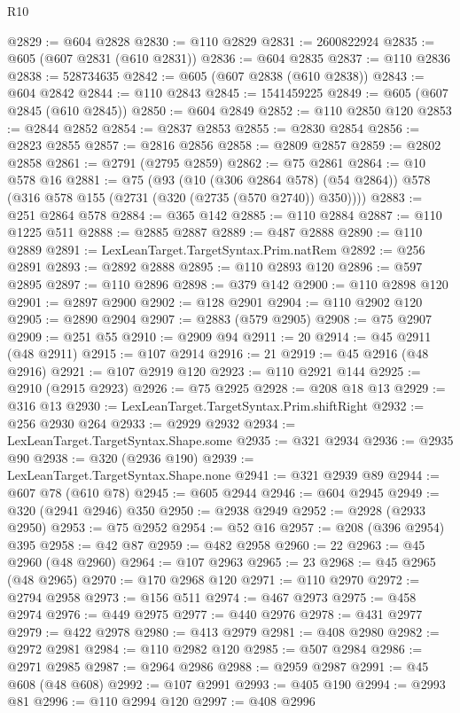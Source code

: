 \begin{lexlean}{R10}
\begin{coremodule}
@2829 := @604 @2828
@2830 := @110 @2829
@2831 := 2600822924
@2835 := @605 (@607 @2831 (@610 @2831))
@2836 := @604 @2835
@2837 := @110 @2836
@2838 := 528734635
@2842 := @605 (@607 @2838 (@610 @2838))
@2843 := @604 @2842
@2844 := @110 @2843
@2845 := 1541459225
@2849 := @605 (@607 @2845 (@610 @2845))
@2850 := @604 @2849
@2852 := @110 @2850 @120
@2853 := @2844 @2852
@2854 := @2837 @2853
@2855 := @2830 @2854
@2856 := @2823 @2855
@2857 := @2816 @2856
@2858 := @2809 @2857
@2859 := @2802 @2858
@2861 := @2791 (@2795 @2859)
@2862 := @75 @2861
@2864 := @10 @578 @16
@2881 := @75
    (@93
      (@10 (@306 @2864 @578) (@54 @2864))
      @578
      (@316 @578 @155 (@2731 (@320 (@2735 (@570 @2740)) @350))))
@2883 := @251 @2864 @578
@2884 := @365 @142
@2885 := @110 @2884
@2887 := @110 @1225 @511
@2888 := @2885 @2887
@2889 := @487 @2888
@2890 := @110 @2889
@2891 := LexLeanTarget.TargetSyntax.Prim.natRem
@2892 := @256 @2891
@2893 := @2892 @2888
@2895 := @110 @2893 @120
@2896 := @597 @2895
@2897 := @110 @2896
@2898 := @379 @142
@2900 := @110 @2898 @120
@2901 := @2897 @2900
@2902 := @128 @2901
@2904 := @110 @2902 @120
@2905 := @2890 @2904
@2907 := @2883 (@579 @2905)
@2908 := @75 @2907
@2909 := @251 @55
@2910 := @2909 @94
@2911 := 20
@2914 := @45 @2911 (@48 @2911)
@2915 := @107 @2914
@2916 := 21
@2919 := @45 @2916 (@48 @2916)
@2921 := @107 @2919 @120
@2923 := @110 @2921 @144
@2925 := @2910 (@2915 @2923)
@2926 := @75 @2925
@2928 := @208 @18 @13
@2929 := @316 @13
@2930 := LexLeanTarget.TargetSyntax.Prim.shiftRight
@2932 := @256 @2930 @264
@2933 := @2929 @2932
@2934 := LexLeanTarget.TargetSyntax.Shape.some
@2935 := @321 @2934
@2936 := @2935 @90
@2938 := @320 (@2936 @190)
@2939 := LexLeanTarget.TargetSyntax.Shape.none
@2941 := @321 @2939 @89
@2944 := @607 @78 (@610 @78)
@2945 := @605 @2944
@2946 := @604 @2945
@2949 := @320 (@2941 @2946) @350
@2950 := @2938 @2949
@2952 := @2928 (@2933 @2950)
@2953 := @75 @2952
@2954 := @52 @16
@2957 := @208 (@396 @2954) @395
@2958 := @42 @87
@2959 := @482 @2958
@2960 := 22
@2963 := @45 @2960 (@48 @2960)
@2964 := @107 @2963
@2965 := 23
@2968 := @45 @2965 (@48 @2965)
@2970 := @170 @2968 @120
@2971 := @110 @2970
@2972 := @2794 @2958
@2973 := @156 @511
@2974 := @467 @2973
@2975 := @458 @2974
@2976 := @449 @2975
@2977 := @440 @2976
@2978 := @431 @2977
@2979 := @422 @2978
@2980 := @413 @2979
@2981 := @408 @2980
@2982 := @2972 @2981
@2984 := @110 @2982 @120
@2985 := @507 @2984
@2986 := @2971 @2985
@2987 := @2964 @2986
@2988 := @2959 @2987
@2991 := @45 @608 (@48 @608)
@2992 := @107 @2991
@2993 := @405 @190
@2994 := @2993 @81
@2996 := @110 @2994 @120
@2997 := @408 @2996

\end{coremodule}
\end{lexlean}
